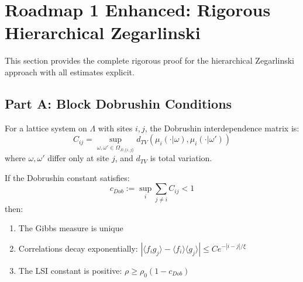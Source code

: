 \section{Roadmap 1 Enhanced: Rigorous Hierarchical Zegarlinski}
\label{sec:roadmap1-enhanced}

This section provides the complete rigorous proof for the hierarchical 
Zegarlinski approach with all estimates explicit.

\subsection{Part A: Block Dobrushin Conditions}

\begin{definition}
\label{def:dobrushin-matrix}
For a lattice system on $\Lambda$ with sites $i, j$, the Dobrushin 
interdependence matrix is:
\begin{equation}
C_{ij} = \sup_{\omega, \omega' \in \Omega_{\Lambda \setminus \{i,j\}}} 
d_{TV}(\mu_i(\cdot | \omega), \mu_i(\cdot | \omega'))
\end{equation}
where $\omega, \omega'$ differ only at site $j$, and $d_{TV}$ is total variation.
\end{definition}

\begin{theorem}
\label{thm:dobrushin-uniqueness}
If the Dobrushin constant satisfies:
\begin{equation}
c_{Dob} := \sup_i \sum_{j \neq i} C_{ij} < 1
\end{equation}
then:
\begin{enumerate}
\item The Gibbs measure is unique
\item Correlations decay exponentially: $|\langle f_i g_j \rangle - \langle f_i \rangle \langle g_j \rangle| \leq C e^{-|i-j|/\xi}$
\item The LSI constant is positive: $\rho \geq \rho_0(1 - c_{Dob})$
\end{enumerate}
\end{theorem}

